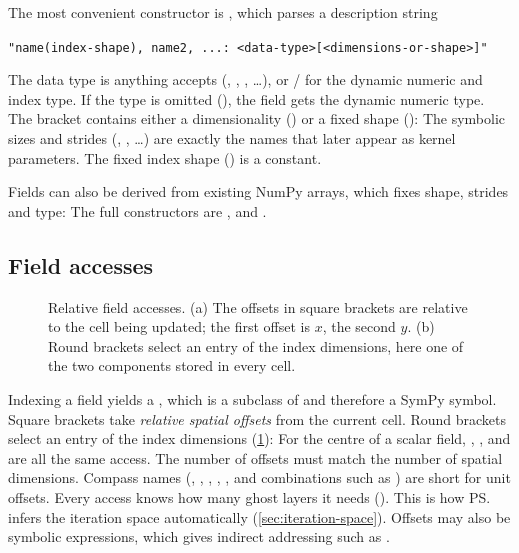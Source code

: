 The most convenient constructor is , which parses a description string
\begin{center}
  \texttt{"name(index-shape), name2, ...: <data-type>[<dimensions-or-shape>]"}
\end{center}
The data type is anything  accepts (,
, , \dots), or  /  for the dynamic
numeric and index type. If the type is omitted (), the field gets the
dynamic numeric type. The bracket contains either a dimensionality () or a
fixed shape ():
The symbolic sizes and strides (, , \dots) are
exactly the names that later appear as kernel parameters. The fixed index shape
() is a constant.

Fields can also be derived from existing NumPy arrays, which fixes shape, strides and
type:
The full constructors are ,
 and
.

\subsection{Field accesses}\label{sec:field-access}


\begin{figure}[htbp]
  \centering
  
  \caption[Relative field accesses]{Relative field accesses. (a) The offsets in square brackets are relative to the cell being updated; the first offset is $x$, the second $y$. (b) Round brackets select an entry of the index dimensions, here one of the two components stored in every cell.}
  \label{fig:field-access}
\end{figure}

Indexing a field yields a , which is a subclass of
 and therefore a SymPy symbol. Square brackets take \emph{relative
spatial offsets} from the current cell. Round brackets select an entry of the index
dimensions (\cref{fig:field-access}):
For the centre of a scalar field, , ,  and
 are all the same access. The number of offsets must match the number of
spatial dimensions. Compass names
(, , , , ,  and combinations such as
) are short for unit offsets. Every access knows how many ghost layers it needs
(). This is how \ps{} infers the iteration space
automatically (\cref{sec:iteration-space}). Offsets may also be symbolic expressions,
which gives indirect addressing such as .

